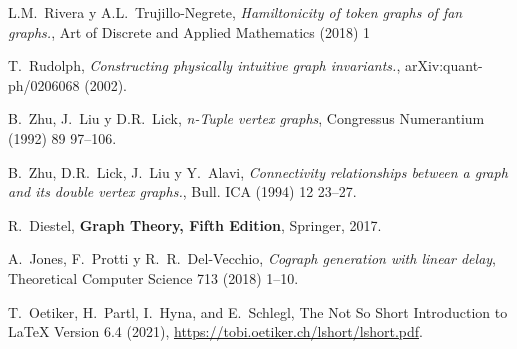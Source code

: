 \begin{thebibliography}{99}
  L.M.~Rivera y A.L.~Trujillo-Negrete,
  \textit{Hamiltonicity of token graphs of fan graphs.},
  Art of Discrete and Applied Mathematics (2018) 1 %

T.~Rudolph,
 \textit{Constructing physically intuitive graph invariants.},
 arXiv:quant-ph/0206068 (2002).

  B.~Zhu, J.~Liu y D.R.~Lick,
 \textit{n-Tuple vertex graphs},
 Congressus Numerantium (1992) 89 97--106.

  B.~Zhu, D.R.~Lick, J.~Liu y Y.~Alavi,
 \textit{Connectivity relationships between a graph and
 its double vertex graphs.},
 Bull. ICA (1994) 12 23--27.


  R.~Diestel,
  \textbf{Graph Theory, Fifth Edition},
  Springer, 2017.

  A.~Jones, F.~Protti y R.~R.~Del-Vecchio,
  \textit{Cograph generation with linear delay},
  Theoretical Computer Science 713 (2018) 1--10.

  T.~Oetiker, H.~Partl, I.~Hyna, and E.~Schlegl,
  The Not So Short Introduction to \LaTeX{} Version 6.4 (2021),
  \href{https://tobi.oetiker.ch/lshort/lshort.pdf}{%
  https://tobi.oetiker.ch/lshort/lshort.pdf}.

\end{thebibliography}
